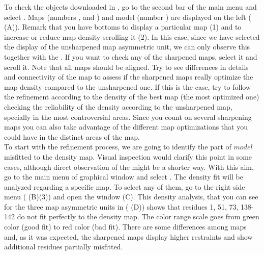   To check the objects downloaded in \coot, go to the second bar of the main menu and select . Maps (numbers ,  and ) and model  (number ) are displayed on the left ( (A)). Remark that you have bottoms to display a particular map (1) and to increase or reduce map density scrolling it (2). In this case, since we have selected the display of the unsharpened map asymmetric unit, we can only observe this  together with the . If you want to check any of the sharpened maps, select it and scroll it. Note that all maps should be aligned. Try to see differences in details and connectivity of the map to assess if the sharpened maps really optimize the map density compared to the unsharpened one. If this is the case, try to follow the refinement according to the density of the best map (the most optimized one) checking the reliability of the density according to the unsharpened map, specially in the most controversial areas. Since you count on several sharpening maps you can also take advantage of the different map optimizations that you could have in the distinct areas of the map.\\  
  
  To start with the refinement process, we are going to identify the part of $model$ misfitted to the density map. Visual inspection would clarify this point in some cases, although direct observation of the  might be a shorter way. With this aim, go to the main menu of \coot graphical window and select . The density fit will be analyzed regarding a specific map. To select any of them, go to the \coot right side menu ( (B)(3)) and open the  window (C). This density analysis, that you can see for the three map asymmetric units in ( (D)) shows that residues 1, 51, 73, 138-142 do not fit perfectly to the density map. The color range scale goes from green color (good fit) to red color (bad fit). There are some differences among maps and, as it was expected, the sharpened maps display higher restraints and show additional residues partially misfitted.
 
